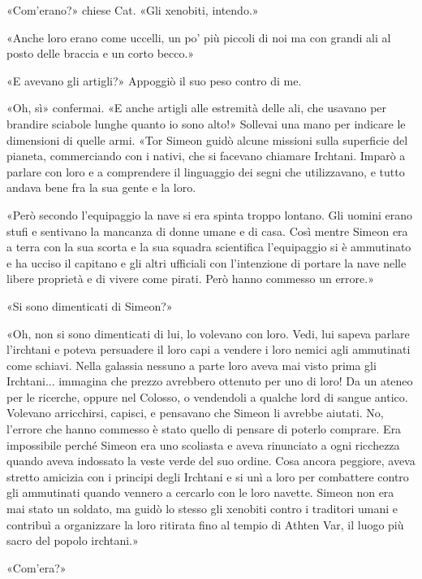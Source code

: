 «Com'erano?» chiese Cat. «Gli xenobiti, intendo.»

«Anche loro erano come uccelli, un po' più piccoli di noi ma con grandi
ali al posto delle braccia e un corto becco.»

«E avevano gli artigli?» Appoggiò il suo peso contro di me.

«Oh, sì» confermai. «E anche artigli alle estremità delle ali, che
usavano per brandire sciabole lunghe quanto io sono alto!» Sollevai una
mano per indicare le dimensioni di quelle armi. «Tor Simeon guidò alcune
missioni sulla superficie del pianeta, commerciando con i nativi, che si
facevano chiamare Irchtani. Imparò a parlare con loro e a comprendere il
linguaggio dei segni che utilizzavano, e tutto andava bene fra la sua
gente e la loro.

«Però secondo l'equipaggio la nave si era spinta troppo lontano. Gli
uomini erano stufi e sentivano la mancanza di donne umane e di casa.
Così mentre Simeon era a terra con la sua scorta e la sua squadra
scientifica l'equipaggio si è ammutinato e ha ucciso il capitano e gli
altri ufficiali con l'intenzione di portare la nave nelle libere
proprietà e di vivere come pirati. Però hanno commesso un errore.»

«Si sono dimenticati di Simeon?»

«Oh, non si sono dimenticati di lui, lo volevano con loro. Vedi, lui
sapeva parlare l'irchtani e poteva persuadere il loro capi a vendere i
loro nemici agli ammutinati come schiavi. Nella galassia nessuno a parte
loro aveva mai visto prima gli Irchtani... immagina che prezzo avrebbero
ottenuto per uno di loro! Da un ateneo per le ricerche, oppure nel
Colosso, o vendendoli a qualche lord di sangue antico. Volevano
arricchirsi, capisci, e pensavano che Simeon li avrebbe aiutati. No,
l'errore che hanno commesso è stato quello di pensare di poterlo
comprare. Era impossibile perché Simeon era uno scoliasta e aveva
rinunciato a ogni ricchezza quando aveva indossato la veste verde del
suo ordine. Cosa ancora peggiore, aveva stretto amicizia con i principi
degli Irchtani e si unì a loro per combattere contro gli ammutinati
quando vennero a cercarlo con le loro navette. Simeon non era mai stato
un soldato, ma guidò lo stesso gli xenobiti contro i traditori umani e
contribuì a organizzare la loro ritirata fino al tempio di Athten Var,
il luogo più sacro del popolo irchtani.»

«Com'era?»

